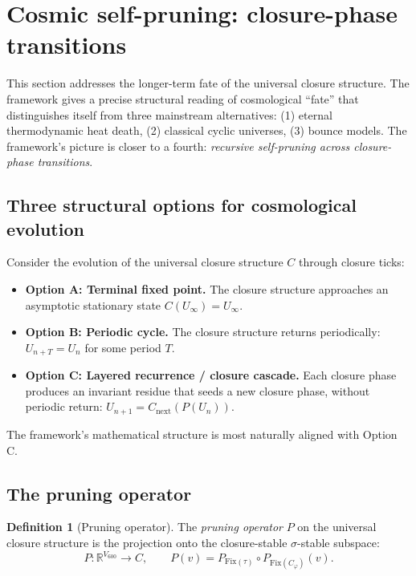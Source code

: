 \documentclass[11pt]{article}
\theoremstyle{plain}
\theoremstyle{definition}
\newtheorem{definition}[theorem]{Definition}
\theoremstyle{remark}
\newcommand{\Fix}{\mathrm{Fix}}
\newcommand{\Cph}{C_\varphi}
\begin{document}
\section{Cosmic self-pruning: closure-phase transitions}\label{sec:cosmic-pruning}

This section addresses the longer-term fate of the universal closure structure. The framework gives a precise structural reading of cosmological ``fate'' that distinguishes itself from three mainstream alternatives: (1) eternal thermodynamic heat death, (2) classical cyclic universes, (3) bounce models. The framework's picture is closer to a fourth: \emph{recursive self-pruning across closure-phase transitions}.

\subsection{Three structural options for cosmological evolution}

Consider the evolution of the universal closure structure $C$ through closure ticks:

\begin{itemize}[leftmargin=2em]
\item \textbf{Option A: Terminal fixed point.} The closure structure approaches an asymptotic stationary state $C(U_\infty) = U_\infty$.
\item \textbf{Option B: Periodic cycle.} The closure structure returns periodically: $U_{n+T} = U_n$ for some period $T$.
\item \textbf{Option C: Layered recurrence / closure cascade.} Each closure phase produces an invariant residue that seeds a new closure phase, without periodic return: $U_{n+1} = C_{\mathrm{next}}(P(U_n))$.
\end{itemize}

The framework's mathematical structure is most naturally aligned with Option C.

\subsection{The pruning operator}

\begin{definition}[Pruning operator]\label{def:pruning}
The \emph{pruning operator} $P$ on the universal closure structure is the projection onto the closure-stable $\sigma$-stable subspace:
\[
  P : \mathbb{R}^{V_{600}} \to C, \qquad P(v) = P_{\Fix(\tau)} \circ P_{\Fix(\Cph)}(v).
\]
\end{definition}
\end{document}
